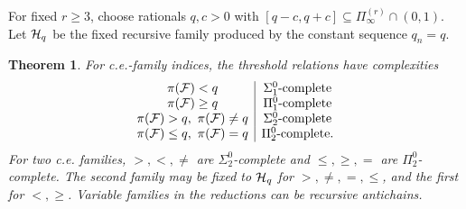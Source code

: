 \documentclass[10pt]{article}
\numberwithin{equation}{section}
\newtheorem{theorem}{Theorem}[section]
\theoremstyle{definition}
\begin{document}
For fixed $r\ge3$, choose rationals $q,c>0$ with $[q-c,q+c]\subseteq\Pi_\infty^{(r)}\cap(0,1)$. Let $\mathcal H_q$ be the fixed recursive family produced by the constant sequence $q_n=q$.
\begin{theorem}\label{thm:cecomparison}
For c.e.-family indices, the threshold relations have complexities
\[
 \begin{array}{c|c}
  \pi(\mathcal F)<q&\Sigma^0_1\text{-complete}\\
  \pi(\mathcal F)\ge q&\Pi^0_1\text{-complete}\\
  \pi(\mathcal F)>q,\ \pi(\mathcal F)\ne q&\Sigma^0_2\text{-complete}\\
  \pi(\mathcal F)\le q,\ \pi(\mathcal F)=q&\Pi^0_2\text{-complete}.
 \end{array}
\]
For two c.e. families, $>,<,\ne$ are $\Sigma^0_2$-complete and $\le,\ge,=$ are $\Pi^0_2$-complete. The second family may be fixed to $\mathcal H_q$ for $>,\ne,=,\le$, and the first for $<,\ge$. Variable families in the reductions can be recursive antichains.
\end{theorem}
\end{document}
